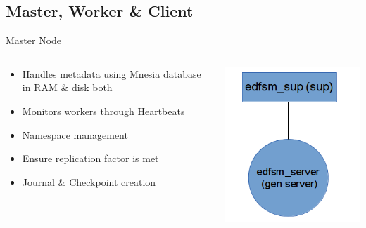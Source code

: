 \documentclass{beamer}
\begin{document}
\subsection{Master, Worker \& Client}
\begin{frame}{Master Node}
\begin{columns}
    \begin{column}{0.7\textwidth}
        \begin{itemize}
        \item Handles metadata using Mnesia database in RAM \& disk both
        \item Monitors workers through Heartbeats
        \item Namespace management
        \item Ensure replication factor is met
        \item Journal \& Checkpoint creation
        \end{itemize}
    \end{column}
    \begin{column}{0.3\textwidth}
        \includegraphics[scale=0.4]{images/master_otp_layout}
    \end{column}
\end{columns}
\end{frame}
\end{document}
